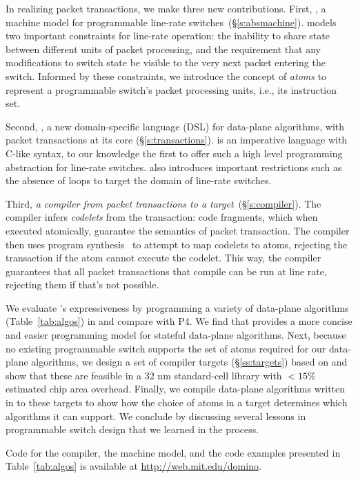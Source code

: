 In realizing packet transactions, we make three new contributions.  First, {\em
\absmachine}, a machine model for programmable line-rate switches~\cite{tofino,
xpliant, flexpipe}(\S\ref{s:absmachine}).  \absmachine models two important
constraints for line-rate operation: the inability to share state between
different units of packet processing, and the requirement that any
modifications to switch state be visible to the very next packet entering the
switch. Informed by these constraints, we introduce the concept of {\em atoms}
to represent a programmable switch's packet processing units, i.e., its
instruction set.

Second, {\em \pktlanguage{}}, a new domain-specific language (DSL) for
data-plane algorithms, with packet transactions at its core
(\S\ref{s:transactions}).  \pktlanguage is an imperative language with C-like
syntax, to our knowledge the first to offer such a high level programming
abstraction for line-rate switches. \pktlanguage also introduces important
restrictions such as the absence of loops to target the domain of line-rate
switches.

Third, {\em a compiler from \pktlanguage packet transactions to a \absmachine
target}~(\S\ref{s:compiler}). The \pktlanguage compiler infers {\em codelets}
from the transaction: code fragments, which when executed atomically, guarantee
the semantics of packet transaction. The compiler then uses program
synthesis~\cite{sketch_asplos} to attempt to map codelets to atoms, rejecting
the transaction if the atom cannot execute the codelet.  This way, the compiler
guarantees that all packet transactions that compile can be run at line rate,
rejecting them if that's not possible.

We evaluate \pktlanguage's expressiveness by programming a variety of
data-plane algorithms (Table~\ref{tab:algos}) in \pktlanguage and compare with
P4. We find that \pktlanguage provides a more concise and easier programming
model for stateful data-plane algorithms.  Next, because no existing
programmable switch supports the set of atoms required for our data-plane
algorithms, we design a set of compiler targets (\S\ref{ss:targets}) based on
\absmachine and show that these are feasible in a 32 nm standard-cell library
with $< 15\%$ estimated chip area overhead. Finally, we compile data-plane
algorithms written in \pktlanguage to these targets to show how the choice of
atoms in a target determines which algorithms it can support. We conclude by
discussing several lessons in programmable switch design that we learned in the
process.

Code for the \pktlanguage compiler, the \absmachine machine model, and the code
examples presented in Table~\ref{tab:algos} is available at
\url{http://web.mit.edu/domino}.
